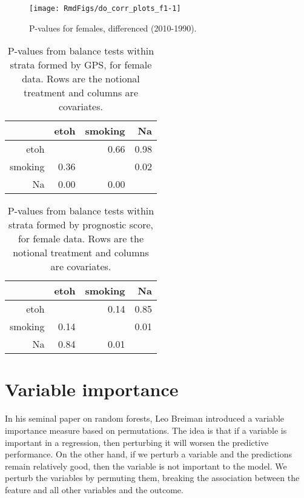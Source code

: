 \documentclass[11pt]{article}\usepackage[]{graphicx}\usepackage[]{color}
\makeatletter
\def\maxwidth{ %
  \ifdim\Gin@nat@width>\linewidth
    \linewidth
  \else
    \Gin@nat@width
  \fi
}
\newenvironment{knitrout}{}{} %
\makeatother
\begin{document}
\begin{knitrout}
\color{fgcolor}\begin{figure}
\texttt{[image: RmdFigs/do\_corr\_plots\_f1-1]} \caption[P-values for females, differenced (2010-1990)]{P-values for females, differenced (2010-1990).}\label{fig:do_corr_plots_f1}
\end{figure}


\end{knitrout}
\begin{table}[ht]
\centering
\begin{tabular}{r|rrr}
  \hline
 & etoh & smoking & Na \\ 
  \hline
etoh &  & 0.66 & 0.98 \\ 
  smoking & 0.36 &  & 0.02 \\ 
  Na & 0.00 & 0.00 &  \\ 
   \hline
\end{tabular}
\caption{P-values from balance tests within strata formed by GPS, for female data.
                    Rows are the notional treatment and columns are covariates.} 
\label{tab:gps_balance_f}
\end{table}
\begin{table}[ht]
\centering
\begin{tabular}{r|rrr}
  \hline
 & etoh & smoking & Na \\ 
  \hline
etoh &  & 0.14 & 0.85 \\ 
  smoking & 0.14 &  & 0.01 \\ 
  Na & 0.84 & 0.01 &  \\ 
   \hline
\end{tabular}
\caption{P-values from balance tests within strata formed by prognostic score, for female data.
                    Rows are the notional treatment and columns are covariates.} 
\label{tab:prog_balance_f}
\end{table}



\clearpage
\section{Variable importance}

In his seminal paper on random forests, Leo Breiman introduced a variable importance measure based on permutations. 
The idea is that if a variable is important in a regression, then perturbing it will worsen the predictive performance. 
On the other hand, if we perturb a variable and the predictions remain relatively good, then the variable is not important to the model. 
We perturb the variables by permuting them, breaking the association between the feature and all other variables and the outcome.
\end{document}
